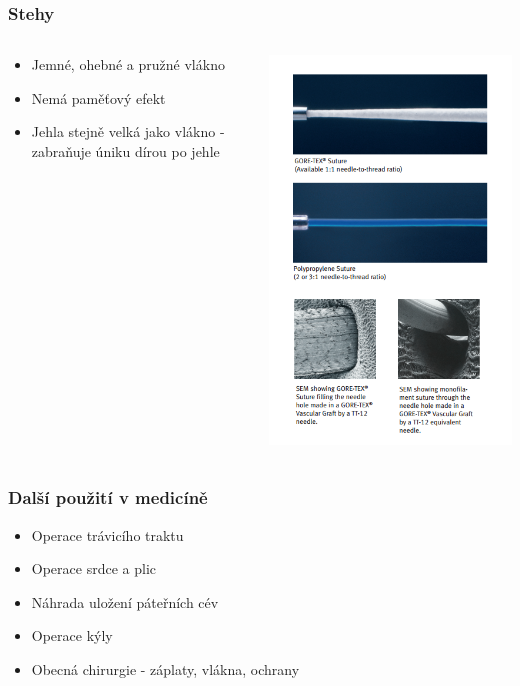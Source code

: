 \begin{frame}
	\frametitle{Stehy}
	\begin{columns}
	\begin{column}{0.5\textwidth}
	\begin{itemize}
		\item Jemné, ohebné a pružné vlákno
		\item Nemá paměťový efekt
		\item Jehla stejně velká jako vlákno - zabraňuje úniku dírou po jehle 
	\end{itemize}
	\end{column}
	\begin{column}{0.5\textwidth}
		\includegraphics[scale=0.38]{needle_thread.png}
	\end{column}
	\end{columns}
\end{frame}

\begin{frame}
	\frametitle{Další použití v medicíně}
	\begin{itemize}
		\item Operace trávicího traktu
		\item Operace srdce a plic
		\item Náhrada uložení páteřních cév
		\item Operace kýly
		\item Obecná chirurgie - záplaty, vlákna, ochrany
	\end{itemize}
\end{frame}